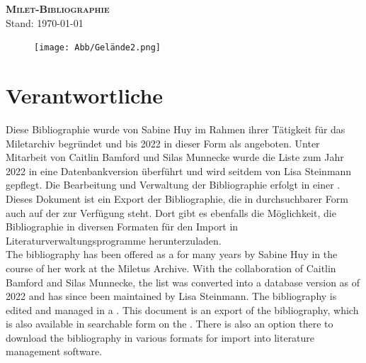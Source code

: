 
\begin{titlepage}
    \vspace*{3cm}
\begin{center}
    {\LARGE \textsc{\textbf{Milet-Bibliographie}}}\\
    
    Stand: \today
\end{center}
\vspace*{3cm}
\begin{figure}[h]
    \texttt{[image: Abb/Gelände2.png]}
\end{figure}

\end{titlepage}

\thispagestyle{empty}
\section*{Verantwortliche}

Diese Bibliographie wurde von Sabine Huy im Rahmen ihrer Tätigkeit für das Miletarchiv begründet und bis 2022 in dieser Form als  angeboten. Unter Mitarbeit von Caitlin Bamford und Silas Munnecke wurde die Liste zum Jahr 2022 in eine Datenbankversion überführt und wird seitdem von Lisa Steinmann gepflegt. Die Bearbeitung und Verwaltung der Bibliographie erfolgt in einer . Dieses Dokument ist ein Export der Bibliographie, die in durchsuchbarer Form auch auf der  zur Verfügung steht. Dort gibt es ebenfalls die Möglichkeit, die Bibliographie in diversen Formaten für den Import in Literaturverwaltungsprogramme herunterzuladen.\\

The bibliography has been offered as a  for many years by Sabine Huy in the course of her work at the Miletus Archive. With the collaboration of Caitlin Bamford and Silas Munnecke, the list was converted into a database version as of 2022 and has since been maintained by Lisa Steinmann. The bibliography is edited and managed in a . This document is an export of the bibliography, which is also available in searchable form on the . There is also an option there to download the bibliography in various formats for import into literature management software. 

